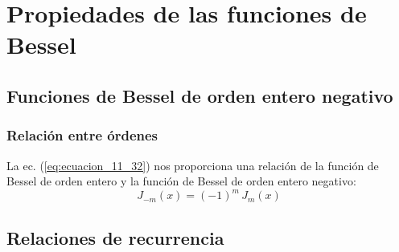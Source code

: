 \documentclass[12pt]{beamer}
\begin{document}
\section{Propiedades de las funciones de Bessel}
\subsection{Funciones de Bessel de orden entero negativo}

\begin{frame}
\frametitle{Relación entre órdenes}
La ec. (\ref{eq:ecuacion_11_32}) nos proporciona una relación de la función de Bessel de orden entero y la función de Bessel de orden entero negativo:
\pause
\begin{equation}
J_{-m} (x) = (-1)^{m} \, J_{m} (x)
\label{eq:ecuacion_27_14}
\end{equation}
\end{frame}

\subsection{Relaciones de recurrencia}
\end{document}
